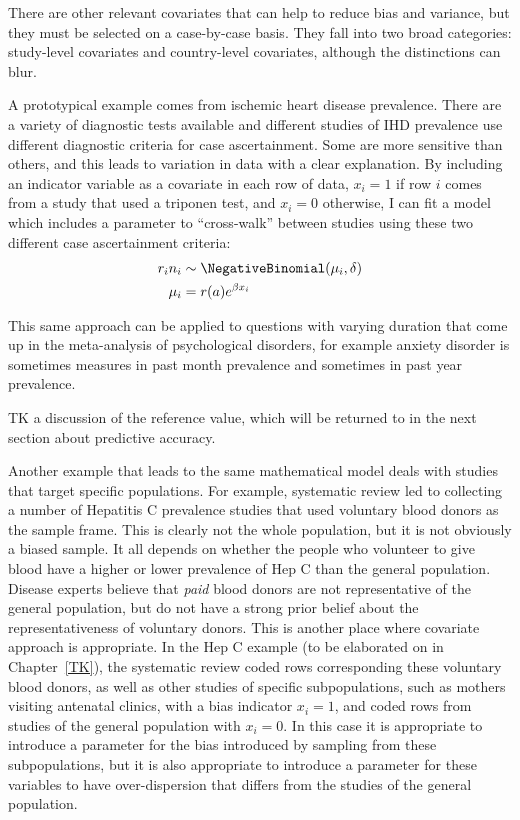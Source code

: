 There are other relevant covariates that can help to reduce bias and
variance, but they must be selected on a case-by-case basis.  They
fall into two broad categories: study-level covariates and
country-level covariates, although the distinctions can blur.

A prototypical example comes from ischemic heart disease prevalence.
There are a variety of diagnostic tests available and different
studies of IHD prevalence use different diagnostic criteria for case
ascertainment.  Some are more sensitive than others, and this leads to
variation in data with a clear explanation.  By including an indicator
variable as a covariate in each row of data, $x_i = 1$ if row $i$
comes from a study that used a triponen test, and $x_i = 0$ otherwise,
I can fit a model which includes a parameter to ``cross-walk'' between
studies using these two different case ascertainment criteria:
\begin{align*}
r_i n_i &\sim \NegativeBinomial(\mu_i, \delta)\\
\mu_i &= r(a)e^{\beta x_i}
\end{align*}

This same approach can be applied to questions with varying duration
that come up in the meta-analysis of psychological disorders, for
example anxiety disorder is sometimes measures in past month
prevalence and sometimes in past year prevalence.

TK a discussion of the reference value, which will be returned to in
the next section about predictive accuracy.

Another example that leads to the same mathematical model deals with
studies that target specific populations.  For example, systematic
review led to collecting a number of Hepatitis C prevalence studies
that used voluntary blood donors as the sample frame.  This is clearly
not the whole population, but it is not obviously a biased sample.  It
all depends on whether the people who volunteer to give blood have a
higher or lower prevalence of Hep C than the general population.
Disease experts believe that \emph{paid} blood donors are not
representative of the general population, but do not have a strong
prior belief about the representativeness of voluntary donors.  This
is another place where covariate approach is appropriate. In the Hep C
example (to be elaborated on in Chapter~\ref{TK}), the systematic
review coded rows corresponding these voluntary blood donors, as well
as other studies of specific subpopulations, such as mothers visiting
antenatal clinics, with a bias indicator $x_i = 1$, and coded rows
from studies of the general population with $x_i = 0$.  In this case
it is appropriate to introduce a parameter for the bias introduced by
sampling from these subpopulations, but it is also appropriate to
introduce a parameter for these variables to have over-dispersion that
differs from the studies of the general population.

